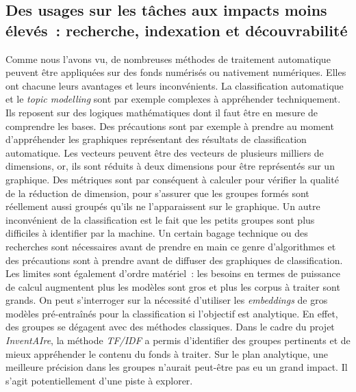 \subsection{Des usages sur les tâches aux impacts moins	élevés~: recherche, indexation et \gls{découvrabilité}}

Comme nous l'avons vu, de nombreuses méthodes de traitement automatique
peuvent être appliquées sur des fonds numérisés ou nativement
numériques. Elles ont chacune leurs avantages et leurs inconvénients. La
classification automatique et le \emph{topic modelling} sont par exemple
complexes à appréhender techniquement. Ils reposent sur des logiques
mathématiques dont il faut être en mesure de comprendre les bases. Des
précautions sont par exemple à prendre au moment d'appréhender les
graphiques représentant des résultats de classification automatique. Les vecteurs
peuvent être des vecteurs de plusieurs milliers de dimensions, or, ils sont
réduits à deux dimensions pour être représentés sur un graphique. Des
métriques sont par conséquent à calculer pour vérifier la qualité de la
réduction de dimension, pour s'assurer que les groupes formés sont
réellement aussi groupés qu'ils ne l'apparaissent sur le graphique. Un autre inconvénient de
la classification est le fait que les petits groupes sont plus
difficiles à identifier par la machine. Un certain bagage technique ou
des recherches sont nécessaires avant de prendre en main ce genre
d'algorithmes et des précautions sont à prendre avant de diffuser des
graphiques de classification. Les limites sont également d'ordre
matériel~: les besoins en termes de puissance de calcul augmentent plus
les modèles sont gros et plus les corpus à traiter sont grands. On peut
s'interroger sur la nécessité d'utiliser les \emph{embeddings} de gros
modèles pré-entraînés pour la classification si l'objectif est
analytique. En effet, des groupes se dégagent avec des méthodes
classiques. Dans le cadre du projet \emph{InventAIre}, la méthode
\emph{TF/IDF} a permis d'identifier des groupes pertinents et de mieux
appréhender le contenu du fonds à traiter. Sur le plan analytique, une
meilleure précision dans les groupes n'aurait peut-être pas eu un grand
impact. Il s'agit potentiellement d'une piste à explorer. 

